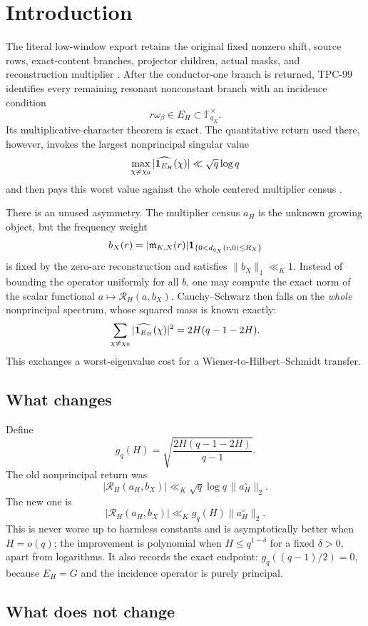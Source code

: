 \section{Introduction}
\label{sec:introduction}

The literal low-window export retains the original fixed nonzero
shift, source rows, exact-content branches, projector children,
actual masks, and reconstruction multiplier
\citep{WangTPC93,WangTPC94}.  After the conductor-one branch is
returned, TPC-99 identifies every remaining resonant nonconstant
branch with an incidence condition
\[
 r\omega_\beta\in E_H
 \subset\mathbb F_{q_X}^{\times}.
\]
Its multiplicative-character theorem is exact.  The quantitative
return used there, however, invokes the largest nonprincipal
singular value
\[
 \max_{\chi\ne\chi_0}
 |\widehat{\mathbf 1_{E_H}}(\chi)|
 \ll\sqrt q\log q
\]
and then pays this worst value against the whole centered multiplier
census \citep{WangTPC99}.

There is an unused asymmetry.  The multiplier census \(a_H\) is the
unknown growing object, but the frequency weight
\[
 b_X(r)
 =
 |\mathfrak m_{K,X}(r)|
 \mathbf 1_{\{0<d_{q_X}(r,0)\le R_X\}}
\]
is fixed by the zero-arc reconstruction and satisfies
\(\|b_X\|_1\ll_K1\).  Instead of bounding the operator uniformly for
all \(b\), one may compute the exact norm of the scalar functional
\(a\mapsto\mathcal R_H(a,b_X)\).  Cauchy--Schwarz then falls on the
\emph{whole} nonprincipal spectrum, whose squared mass is known
exactly:
\[
 \sum_{\chi\ne\chi_0}
 |\widehat{\mathbf 1_{E_H}}(\chi)|^2
 =2H(q-1-2H).
\]
This exchanges a worst-eigenvalue cost for a
Wiener-to-Hilbert--Schmidt transfer.

\subsection{What changes}

Define
\[
 g_q(H)
 =
 \sqrt{\frac{2H(q-1-2H)}{q-1}}.
\]
The old nonprincipal return was
\[
 |\mathcal R_H(a_H,b_X)|
 \ll_K\sqrt q\log q\,\|a_H^\circ\|_2.
\]
The new one is
\[
 |\mathcal R_H(a_H,b_X)|
 \ll_K g_q(H)\|a_H^\circ\|_2.
\]
This is never worse up to harmless constants and is asymptotically
better when \(H=o(q)\); the improvement is polynomial when
\(H\le q^{1-\delta}\) for a fixed \(\delta>0\), apart from
logarithms.  It also records the exact endpoint:
\(g_q((q-1)/2)=0\), because \(E_H=G\) and the incidence operator is
purely principal.

\subsection{What does not change}

